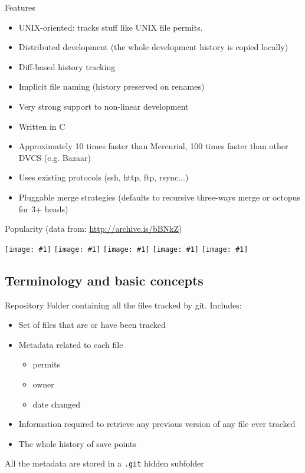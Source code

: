 \documentclass[presentation]{beamer}
\begin{document}
\begin{frame}[fragile]{Features}
	\begin{itemize}
		\item UNIX-oriented: tracks stuff like UNIX file permits.
		\item Distributed development (the whole development history is copied locally)
		\item Diff-based history tracking
		\item Implicit file naming (history preserved on renames)
		\item Very strong support to non-linear development
		\item Written in C
		\item Approximately 10 times faster than Mercurial, 100 times faster than other DVCS (e.g. Bazaar)
		\item Uses existing protocols (ssh, http, ftp, rsync...)
		\item Pluggable merge strategies (defaults to recursive three-ways merge or octopus for 3+ heads)
	\end{itemize}
\end{frame}

\newcommand{\fullsizeimage}[1]{\texttt{[image: \#1]}}

\begin{frame}[allowframebreaks]{Popularity (data from: \url{http://archive.is/bBNkZ})}
    \begin{center}
        \fullsizeimage{img/questions}
        \fullsizeimage{img/search}
        \fullsizeimage{img/questionsbynum}
        \fullsizeimage{img/questionsbyshare}
        \fullsizeimage{img/interest}
    \end{center}
\end{frame}

\subsection{Terminology and basic concepts}

\begin{frame}{Repository}
    Folder containing all the files tracked by git. Includes:
    \begin{itemize}
        \item Set of files that are or have been tracked
        \item Metadata related to each file
        \begin{itemize}
            \item permits
            \item owner
            \item date changed
        \end{itemize}
        \item Information required to retrieve any previous version of any file ever tracked
        \item The whole history of save points
    \end{itemize}
    All the metadata are stored in a \texttt{.git} hidden subfolder
\end{frame}
\end{document}
